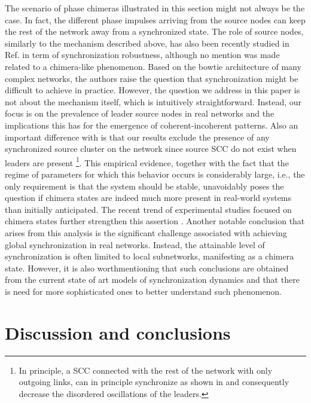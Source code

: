 \documentclass[prx,twocolumn,amsmath,noshowkeys,noshowpacs,amssymb]{revtex4-2}
\begin{document}
The scenario of phase chimeras illustrated in this section might not always be the case. In fact, the different phase impulses arriving from the source nodes can keep the rest of the network away from a synchronized state. The role of source nodes, similarly to the mechanism described above, has also been recently studied in Ref. \cite{wright_central_2019} in term of synchronization robustness, although no mention was made related to a chimera-like phenomenon. Based on the bowtie architecture of many complex networks, the authors raise the question that synchronization might be difficult to achieve in practice. However, the question we address in this paper is not about the mechanism itself, which is intuitively straightforward. Instead, our focus is on the prevalence of leader source nodes in real networks and the implications this has for the emergence of coherent-incoherent patterns. {Also an important difference with \cite{wright_central_2019} is that our results exclude the presence of any synchronized source cluster on the network since source SCC do not exist when leaders are present \footnote{{In principle, a SCC connected with the rest of the network with only outgoing links, can in principle synchronize as shown in \cite{symm_break} and consequently decrease the disordered oscillations of the leaders.}}.} This empirical evidence, together with the fact that the regime of parameters for which this behavior occurs is considerably large, i.e., the only requirement is that the system should be stable, unavoidably poses the question if chimera states are indeed much more present in real-world systems than initially anticipated. The recent trend of experimental studies focused on chimera states further strengthen this assertion \cite{chimera_brain, chimera_firefly}. {Another notable conclusion that arises from this analysis is the significant challenge associated with achieving global synchronization in real networks. Instead, the attainable level of synchronization is often limited to local subnetworks, manifesting as a chimera state. However,} it is also worthmentioning that such conclusions are obtained from the current state of art models of synchronization dynamics and that there is need for more sophisticated ones to better understand such phenomenon.


\section{Discussion and conclusions}
\label{sec:V}
\noindent 
\end{document}
